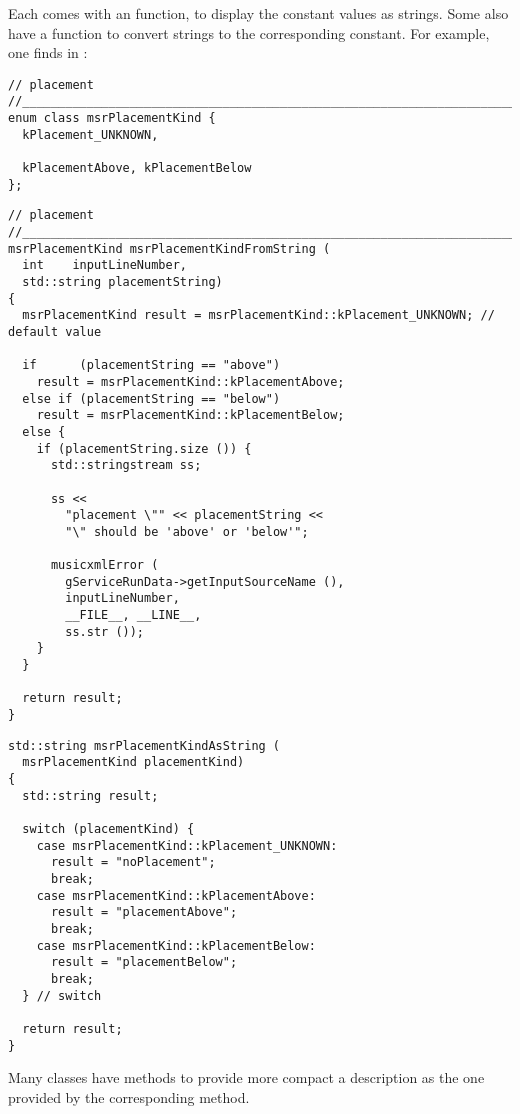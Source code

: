 Each \enumType comes with an  function, to display the constant values as strings. Some also have a  function to convert strings to the corresponding constant. For example, one finds in :
\begin{lstlisting}[language=CPlusPlus]
// placement
//______________________________________________________________________________
enum class msrPlacementKind {
  kPlacement_UNKNOWN,

  kPlacementAbove, kPlacementBelow
};
\end{lstlisting}

\begin{lstlisting}[language=CPlusPlus]
// placement
//______________________________________________________________________________
msrPlacementKind msrPlacementKindFromString (
  int    inputLineNumber,
  std::string placementString)
{
  msrPlacementKind result = msrPlacementKind::kPlacement_UNKNOWN; // default value

  if      (placementString == "above")
    result = msrPlacementKind::kPlacementAbove;
  else if (placementString == "below")
    result = msrPlacementKind::kPlacementBelow;
  else {
    if (placementString.size ()) {
      std::stringstream ss;

      ss <<
        "placement \"" << placementString <<
        "\" should be 'above' or 'below'";

      musicxmlError (
        gServiceRunData->getInputSourceName (),
        inputLineNumber,
        __FILE__, __LINE__,
        ss.str ());
    }
  }

  return result;
}
\end{lstlisting}

\begin{lstlisting}[language=CPlusPlus]
std::string msrPlacementKindAsString (
  msrPlacementKind placementKind)
{
  std::string result;

  switch (placementKind) {
    case msrPlacementKind::kPlacement_UNKNOWN:
      result = "noPlacement";
      break;
    case msrPlacementKind::kPlacementAbove:
      result = "placementAbove";
      break;
    case msrPlacementKind::kPlacementBelow:
      result = "placementBelow";
      break;
  } // switch

  return result;
}
\end{lstlisting}

Many classes have  methods to provide more compact a description as the one provided by the corresponding  method.%


